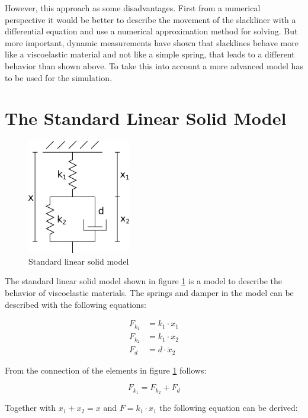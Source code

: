 However, this approach as some disadvantages. First from a numerical perspective it would be better to describe the movement of the slackliner with a differential equation and use a numerical approximation method for solving. But more important, dynamic measurements have shown that slacklines behave more like a viscoelastic material and not like a simple spring, that leads to a different behavior than shown above. To take this into account a more advanced model has to be used for the simulation.

\section{The Standard Linear Solid Model}

\begin{figure}[htb] \centering
	\includegraphics[width=0.4\textwidth]{images/dynamicStandardModel.pdf}
	\caption{Standard linear solid model}
	\label{fig:dynamicStandardModel}
\end{figure}

The standard linear solid model shown in figure \ref{fig:dynamicStandardModel} is a model to describe the behavior of viscoelastic materials. The springs and damper in the model can be described with the following equations:

\begin{align}
F_{k_1} &= k_1 \cdot x_1 \\
F_{k_2} &= k_1 \cdot x_2 \\
F_{d} &= d \cdot \dot x_2
\end{align}

From the connection of the elements in figure \ref{fig:dynamicStandardModel} follows:

\begin{equation}
	F_{k_1} = F_{k_2} + F_d
\end{equation}

Together with $x_1 + x_2 = x$ and $F = k_1 \cdot x_1$ the following equation can be derived:

